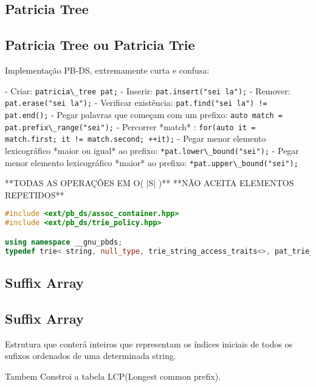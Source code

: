 \documentclass[11pt, a4paper, twoside]{article}
\begin{document}
\subsection{Patricia Tree}

\subsection{Patricia Tree ou Patricia Trie}

Implementação PB-DS, extremamente curta e confusa:

- Criar: \lstinline{patricia\_tree pat;}
- Inserir: \lstinline{pat.insert("sei la");}
- Remover: \lstinline{pat.erase("sei la");}
- Verificar existência: \lstinline{pat.find("sei la") != pat.end();}
- Pegar palavras que começam com um prefixo: \lstinline{auto match = pat.prefix\_range("sei");}
- Percorrer *match* : \lstinline{for(auto it = match.first; it != match.second; ++it);}
- Pegar menor elemento lexicográfico *maior ou igual* ao prefixo: \lstinline{*pat.lower\_bound("sei");} 
- Pegar menor elemento lexicográfico *maior* ao prefixo: \lstinline{*pat.upper\_bound("sei");} 

**TODAS AS OPERAÇÕES EM O( |S| )**  
**NÃO ACEITA ELEMENTOS REPETIDOS**

\begin{lstlisting}[language=C++]
#include <ext/pb_ds/assoc_container.hpp>
#include <ext/pb_ds/trie_policy.hpp>

using namespace __gnu_pbds;
typedef trie< string, null_type, trie_string_access_traits<>, pat_trie_tag, trie_prefix_search_node_update> patricia_tree;
\end{lstlisting}

\subsection{Suffix Array}

\subsection{Suffix Array}



Estrutura que conterá inteiros que representam os índices iniciais de todos os sufixos ordenados de uma determinada string.

Tambem Constroi a tabela LCP(Longest common prefix).
\end{document}
